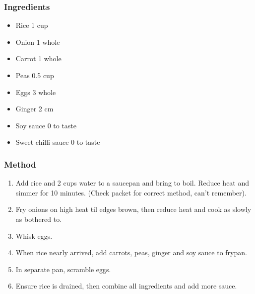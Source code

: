 \documentclass[]{article}
\begin{document}
\subsubsection*{\Large Ingredients}
\begin{multicols}{2}
\begin{itemize}
 \item Rice \hfill 1 cup
 \item Onion \hfill 1 whole
 \item Carrot \hfill 1 whole
 \item Peas \hfill 0.5 cup
 \item Eggs \hfill 3 whole
 \item Ginger \hfill 2 cm
 \item Soy sauce \hfill 0 to taste
 \item Sweet chilli sauce \hfill 0 to taste
\end{itemize}
\end{multicols}
\subsubsection*{\Large Method}
\begin{enumerate}[font=\huge\color{accent}]
	\item Add rice and 2 cups water to a saucepan and bring to boil. Reduce heat and simmer for 10 minutes. (Check packet for correct method, can't remember).
	\item Fry onions on high heat til edges brown, then reduce heat and cook as slowly as bothered to.
	\item Whisk eggs.
	\item When rice nearly arrived, add carrots, peas, ginger and soy sauce to frypan.
	\item In separate pan, scramble eggs.
	\item Ensure rice is drained, then combine all ingredients and add more sauce.
\end{enumerate}
\newpage
{}\label{rec:Sticky Pork Stir-Fry}
\end{document}
